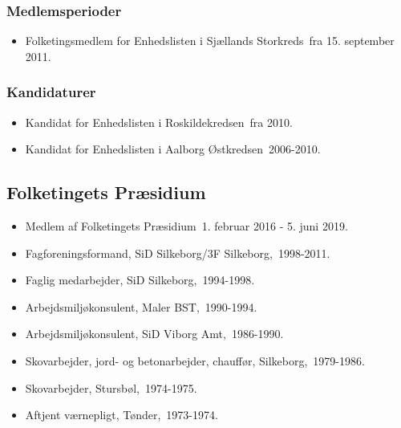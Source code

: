 \documentclass[11pt, a4paper]{awesome-cv}
\begin{document}
\begin{cvletter}
\subsubsection*{Medlemsperioder}
\begin{itemize}
\item Folketingsmedlem for Enhedslisten i Sjællands Storkreds fra 15. september 2011.
\end{itemize}
\subsubsection*{Kandidaturer}
\begin{itemize}
\item Kandidat for Enhedslisten i Roskildekredsen fra 2010.
\item Kandidat for Enhedslisten i Aalborg Østkredsen 2006-2010.
\end{itemize}
\subsection*{Folketingets Præsidium}
\begin{itemize}
\item Medlem af Folketingets Præsidium 1. februar 2016 - 5. juni 2019.
\end{itemize}
\begin{itemize}
\item Fagforeningsformand, SiD Silkeborg/3F Silkeborg, 1998-2011.
\item Faglig medarbejder, SiD Silkeborg, 1994-1998.
\item Arbejdsmiljøkonsulent, Maler BST, 1990-1994.
\item Arbejdsmiljøkonsulent, SiD Viborg Amt, 1986-1990.
\item Skovarbejder, jord- og betonarbejder, chauffør, Silkeborg, 1979-1986.
\item Skovarbejder, Stursbøl, 1974-1975.
\item Aftjent værnepligt, Tønder, 1973-1974.
\end{itemize}
\end{cvletter}
\end{document}
